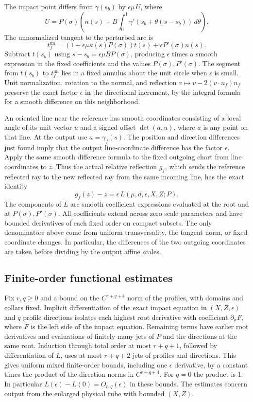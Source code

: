 \documentclass[11pt]{article}
\begin{document}
The impact point differs from \(\gamma(s_b)\) by \(\epsilon\mu\, U\), where \[
 U=P(\sigma)\left(n(s)+B\int_0^1\gamma'(s_b+\theta(s-s_b))\,d\theta\right).
\] The unnormalized tangent to the perturbed arc is \[
 t_f^{\mathrm{un}}=(1+\epsilon\mu\kappa(s)P(\sigma))t(s)+\epsilon P'(\sigma)n(s).
\] Subtract \(t(s_b)\) using \(s-s_b=\epsilon\mu BP(\sigma)\), producing
\(\epsilon\) times a smooth expression in the fixed coefficients and the values
\(P(\sigma), P'(\sigma)\). The segment from \(t(s_b)\) to \(t_f^{\mathrm{un}}\)
lies in a fixed annulus about the unit circle when \(\epsilon\) is small. Unit
normalization, rotation to the normal, and reflection
\(v\mapsto v-2(v\cdot n_f)n_f\) preserve the exact factor \(\epsilon\) in the
directional increment, by the integral formula for a smooth difference on this
neighborhood.

An oriented line near the reference has smooth coordinates consisting of a local
angle of its unit vector \(u\) and a signed offset \(\det(a,u)\), where \(a\) is
any point on that line. At the output use \(a=\gamma_f(s)\). The position and
direction differences just found imply that the output line-coordinate
difference has the factor \(\epsilon\). Apply the same smooth difference formula
to the fixed outgoing chart from line coordinates to \(z\). Thus the actual
relative reflection \(g_f\), which sends the reference reflected ray to the new
reflected ray from the same incoming line, has the exact identity \[
 g_f(z)-z=\epsilon\,L(\mu,d,\epsilon,X,Z;P).
\] The components of \(L\) are smooth coefficient expressions evaluated at the
root and at \(P(\sigma),P'(\sigma)\). All coefficients extend across zero scale
parameters and have bounded derivatives of each fixed order on compact subsets. The only denominators above come from uniform transversality, the tangent norm,
or fixed coordinate changes. In particular, the differences of the two outgoing
coordinates are taken before dividing by the output affine scales.

\subsection{Finite-order functional
estimates}\label{finite-order-functional-estimates}

Fix \(r,q\geq0\) and a bound on the \(C^{r+q+4}\) norm of the profiles, with
domains and collars fixed. Implicit differentiation of the exact impact equation
in \((X,Z,\epsilon)\) and \(q\) profile directions isolates each highest root
derivative with coefficient \(\partial_\sigma F\), where \(F\) is the left side
of the impact equation. Remaining terms have earlier root derivatives and
evaluations of finitely many jets of \(P\) and the directions at the same root.
Induction through total order at most \(r+q+1\), followed by differentiation of
\(L\), uses at most \(r+q+2\) jets of profiles and directions. This gives
uniform mixed finite-order bounds, including one \(\epsilon\) derivative, by a
constant times the product of the direction norms in \(C^{r+q+4}\). For \(q=0\)
the product is 1. In particular \(L(\epsilon)-L(0)=O_{r,q}(\epsilon)\) in these
bounds. The estimates concern output from the enlarged physical tube with
bounded \((X,Z)\).
\end{document}
